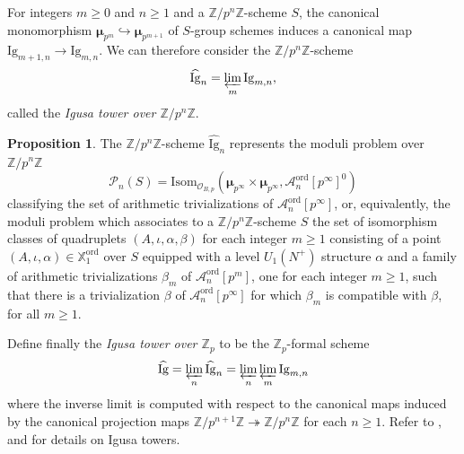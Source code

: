 \documentclass[a4paper]{amsart}
\numberwithin{equation}{section}
\theoremstyle{definition}
\newtheorem{proposition}[theorem]{Proposition}
\newcommand{\Z}{\mathbb{Z}}
\newcommand{\X}{\mathbb{X}}
\newcommand{\ord}{\mathrm{ord}}
\begin{document}
For integers $m\geq 0$ and $n\geq 1$ and a $\Z/p^n\Z$-scheme $S$, the canonical monomorphism $\boldsymbol{\mu}_{p^m}\hookrightarrow \boldsymbol{\mu}_{p^{m+1}}$ of $S$-group schemes induces a canonical map $\mathrm{Ig}_{m+1,n}\rightarrow\mathrm{Ig}_{m,n}$. We can therefore consider the $\Z/p^n\Z$-scheme \[\widehat{\mathrm{Ig}}_n=\varprojlim_m\mathrm{Ig}_{m,n},\] called the \textit{Igusa tower over $\Z/p^n\Z$}.

\begin{proposition}
The $\Z/p^n\Z$-scheme $\widehat{\mathrm{Ig}}_n$ represents the moduli problem over $\Z/p^n\Z$ \[\mathcal{P}_n(S)=\mathrm{Isom}_{\mathcal{O}_{B,p}}\left(\boldsymbol{\mu}_{p^\infty}\times\boldsymbol{\mu}_{p^\infty},\mathcal{A}_n^\ord[p^\infty]^0\right)\]
classifying the set of arithmetic trivializations of $\mathcal{A}^\ord_n[p^\infty]$, or, equivalently, the moduli problem which associates to a $\Z/p^n\Z$-scheme $S$ the set of isomorphism classes of quadruplets $(A,\iota,\alpha,\beta)$ for each integer $m\geq 1$ consisting of a point $(A,\iota,\alpha)\in\X^\mathrm{ord}_1$ over $S$ equipped with a level $U_1(N^+)$ structure $\alpha$ and a family of arithmetic trivializations $\beta_{m}$ of $\mathcal{A}_n^\ord[p^m]$, one for each integer $m\geq 1$, such that there is a trivialization $\beta$ of $\mathcal{A}_n^\ord[p^\infty]$ for which $\beta_{m} $ is compatible with $\beta$, for all $m\geq1$.
\end{proposition}

Define finally the \textit{Igusa tower over $\Z_p$} to be the $\Z_p$-formal scheme 
\[\widehat{\text{Ig}}=\varprojlim_n\widehat{\mathrm{Ig}}_n=\varprojlim_n\varprojlim_m\mathrm{Ig}_{m,n}\]
where the inverse limit is computed with respect to the canonical maps
induced by the canonical projection maps 
$\Z/p^{n+1}\Z\twoheadrightarrow\Z/p^{n}\Z$ for each $n\geq 1$. Refer to \cite[Chapter 8]{Hida.book}, \cite[\S2.1]{Hida.Control} and \cite[\S2.5]{Burungale} for details on Igusa towers.
\end{document}
